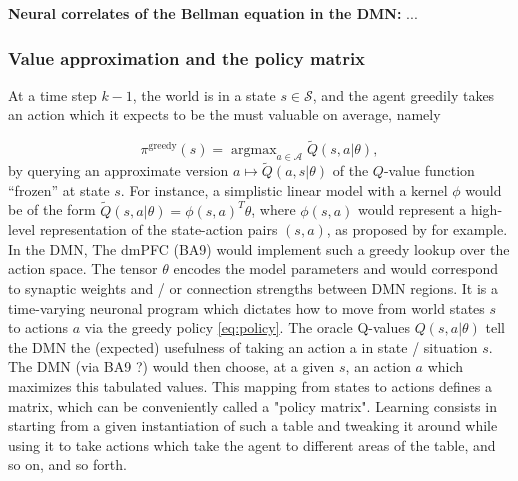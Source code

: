 \documentclass[10pt,letterpaper]{article}
\DeclareMathOperator{\argmax}{argmax}
\begin{document}
\begin{mdframed}
  \textbf{ Neural correlates of the Bellman equation in the DMN:}
  ...
\end{mdframed}

\subsubsection{Value approximation and the policy matrix}
At a time step $k-1$, the world is in a state $s \in \mathcal S$, and the agent greedily takes an
action which it expects to be the must valuable on average, namely

\begin{equation}
  \pi^{\text{greedy}}(s) = \argmax_{a \in \mathcal A}\tilde{Q}(s, a|\theta),
  \label{eq:policy}
\end{equation}
by querying an approximate version $a \mapsto \tilde{Q}(a,s|\theta)$ of the $Q$-value function ``frozen'' at state $s$. For instance, a simplistic linear model with a kernel $\phi$ would be of the
form $\tilde{Q}(s, a|\theta) = \phi(s,a)^T\theta$, where
$\phi(s,a)$ would represent a high-level representation of the state-action pairs
$(s,a)$, as proposed by \citep{songNIPS2016} for example.
In the DMN, The dmPFC (BA9) would implement such a greedy lookup over the action space.
The tensor $\theta$ encodes the model
  parameters and would correspond to synaptic weights and / or connection strengths between
  DMN regions. It is a time-varying neuronal program which dictates how to move from world states $s$ to actions $a$ via the greedy policy \eqref{eq:policy}.
  The oracle Q-values $Q(s, a|\theta)$ tell the DMN the (expected) usefulness of taking an action a in state / situation  $s$. The DMN (via BA9 ?) would then choose, at a given $s$, an action $a$ which maximizes this tabulated values. This mapping from states to actions defines a matrix, which can be conveniently called a "policy matrix". Learning consists in starting from a given instantiation of such a table and tweaking it around while using it to take actions which take the agent to different areas of the table, and so on, and so forth.
\end{document}
